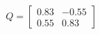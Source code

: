 \documentclass[preview]{standalone}
\begin{document}
\begin{align*}
Q = \begin{bmatrix} 0.83 & -0.55 \\ 0.55 & 0.83 \end{bmatrix}
\end{align*}
\end{document}
